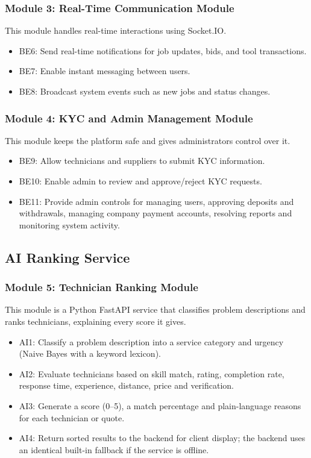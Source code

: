 \documentclass[A4paper,12pt]{report}
\theoremstyle{plain}
\theoremstyle{definition}
\theoremstyle{remark}
\numberwithin{equation}{section}
\begin{document}
\subsubsection{Module 3: Real-Time Communication Module}

This module handles real-time interactions using Socket.IO.

\begin{itemize}
    \item BE6: Send real-time notifications for job updates, bids, and tool transactions.
    \item BE7: Enable instant messaging between users.
    \item BE8: Broadcast system events such as new jobs and status changes.
\end{itemize}

\subsubsection{Module 4: KYC and Admin Management Module}

This module keeps the platform safe and gives administrators control over it.

\begin{itemize}
    \item BE9: Allow technicians and suppliers to submit KYC information.
    \item BE10: Enable admin to review and approve/reject KYC requests.
        \item BE11: Provide admin controls for managing users, approving deposits and withdrawals, managing company payment accounts, resolving reports and monitoring system activity.
\end{itemize}

\subsection{AI Ranking Service}

\subsubsection{Module 5: Technician Ranking Module}

This module is a Python FastAPI service that classifies problem descriptions and ranks technicians, explaining every score it gives.

\begin{itemize}
    \item AI1: Classify a problem description into a service category and urgency (Naive Bayes with a keyword lexicon).
    \item AI2: Evaluate technicians based on skill match, rating, completion rate, response time, experience, distance, price and verification.
    \item AI3: Generate a score (0–5), a match percentage and plain-language reasons for each technician or quote.
    \item AI4: Return sorted results to the backend for client display; the backend uses an identical built-in fallback if the service is offline.
\end{itemize}
\end{document}
